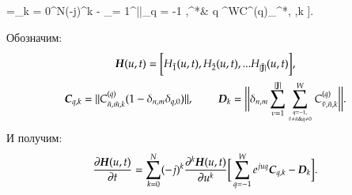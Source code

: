 \begin{urv}{60}
	 =\sum_{k = 0}^{N}(-j)^k\bigg[
	\sum_{q = -1}^{W} e^{juq} \sum_{\nu = 1, \atop \tilde{\nu}\neq \bold{y}^*\& q\neq 0}^{|\mathbb{J}|} 
	 C^{(q)}_{\tilde{\nu}, \bold{y}^*,k}\pdv[k]{H_{\tilde{\nu}}(u,t)}{u}
	-
	\sum_{\nu = 1}^{||}\sum_{q = -1 ,\atop \tilde{\nu}\neq {}^*\& q }^{W}C^{(q)}_{^*, \tilde{\nu},k}
	\bigg].\\
\end{urv}	
Обозначим:
\begin{gather*}
	\boldsymbol{H}(u,t) = \bigg[H_{\tilde{1}}(u,t), H_{\tilde{2}}(u,t), ... H_{\tilde{|\mathbb{J}|} }(u,t)\bigg] ,\\
	\boldsymbol{C}_{q,k} = ||C^{(q)}_{\tilde{n},\tilde{m}, k}(1-\delta_{n,m}\delta_{q,0})||,
	\text{ }\text{ }\text{ }\text{ }\text{ }\text{ }\text{ }\text{ }\text{ }\boldsymbol{D}_k = \bigg|\bigg|\delta_{n,m}
    \sum_{\nu = 1}^{|\mathbb{J}|}\sum_{q = -1 ,\atop \tilde{\nu}\neq \tilde{n}\& q\neq 0 }^{W}C^{(q)}_{\tilde{\nu},\tilde{n},k} \bigg|\bigg|.
\end{gather*}
И получим:
\begin{equation} \label{pervoe_uravnenie}
	\pdv{\boldsymbol{H}(u,t)}{t} =\sum_{k = 0}^{N}(-j)^k\pdv[k]{\boldsymbol{H}(u,t)}{u}\bigg[
	\sum_{q = -1}^{W} e^{juq}\boldsymbol{C}_{q,k}-\boldsymbol{D}_k\bigg].
\end{equation}
